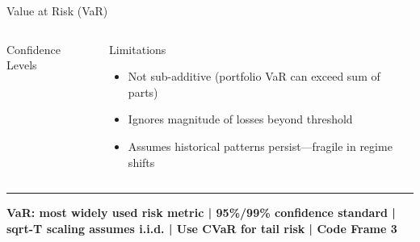 \documentclass[8pt,aspectratio=169]{beamer}
\newcommand{\bottomnote}[1]{\vfill\vspace{-2mm}\textcolor{mllavender2}{\rule{\textwidth}{0.4pt}}\vspace{1mm}\footnotesize\textbf{#1}}
\begin{document}
\begin{frame}[fragile]{Value at Risk (VaR)}
\begin{columns}[T]
\begin{block}{Confidence Levels}
\begin{itemize}
\end{itemize}
\end{block}
\vspace{2mm}
\begin{block}{Limitations}
\begin{itemize}\setlength{\itemsep}{2pt}
  \item Not sub-additive (portfolio VaR can exceed sum of parts)
  \item Ignores magnitude of losses beyond threshold
  \item Assumes historical patterns persist---fragile in regime shifts
\end{itemize}
\end{block}
\end{columns}
\bottomnote{VaR: most widely used risk metric | 95\%/99\% confidence standard | sqrt-T scaling assumes i.i.d. | Use CVaR for tail risk | Code Frame 3}
\end{frame}
\end{document}
